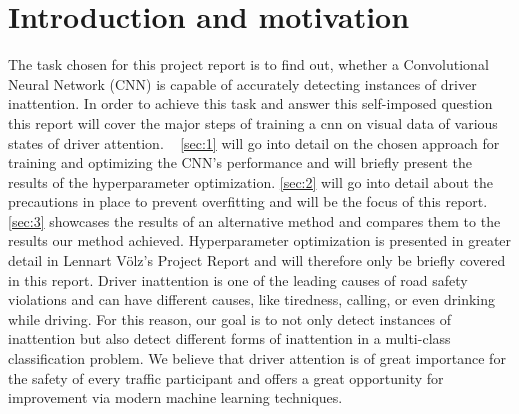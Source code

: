 \section{Introduction and motivation}
The task chosen for this project report is to find out, whether a Convolutional Neural Network (CNN) is capable of accurately detecting instances of driver inattention. 
In order to achieve this task and answer this self-imposed question this report will cover the major steps of training a cnn on visual data of various states of driver attention.  
\autoref{sec:1} will go into detail on the chosen approach for training and optimizing the CNN's performance and will briefly present the results of the hyperparameter optimization. \autoref{sec:2} will go into detail about the precautions in place to prevent overfitting and will be the focus of this report.
\autoref{sec:3} showcases the results of an alternative method and compares them to the results our method achieved.
Hyperparameter optimization is presented in greater detail in Lennart Völz's Project Report and will therefore only be briefly covered in this report. 
Driver inattention is one of the leading causes of road safety violations and can have different causes, like tiredness, calling, or even drinking while driving. For this reason, our goal is to not only detect instances of inattention 
but also detect different forms of inattention in a multi-class classification problem. We believe that driver attention is of great importance for the safety of every traffic participant and offers a great opportunity for improvement via 
modern machine learning techniques.